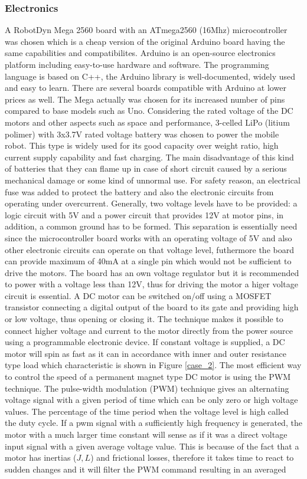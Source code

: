 \documentclass[12pt,english]{article}
\begin{document}
\subsubsection{Electronics}
A RobotDyn Mega 2560 board with an ATmega2560 (16Mhz) microcontroller was chosen which is a cheap version of the original Arduino board having the same capabilities and compatibilites. Arduino is an open-source electronics platform including easy-to-use hardware and software.\cite{arduino} The programming language is based on C++, the Arduino library is well-documented, widely used and easy to learn. There are several boards compatible with Arduino at lower prices as well. The Mega actually was chosen for its increased number of pins compared to base models such as Uno.
Considering the rated voltage of the DC motors and other aspects such as space and performance, 3-celled LiPo (litium polimer) with 3x3.7V rated voltage battery was chosen to power the mobile robot. This type is widely used for its good capacity over weight ratio, high current supply capability and fast charging. The main disadvantage of this kind of batteries that they can flame up in case of short circuit caused by a serious mechanical damage or some kind of unnormal use. For safety reason, an electrical fuse was added to protect the battery and also the electronic circuits from operating under overcurrent. Generally, two voltage levels have to be provided: a logic circuit with 5V and a power circuit that provides 12V at motor pins, in addition, a common ground has to be formed. This separation is essentially need since the microcontroller board works with an operating voltage of 5V and also other electronic circuits can operate on that voltage level, futhermore the board can provide maximum of 40mA at a single pin which would not be sufficient to drive the motors. The board has an own voltage regulator but it is recommended to power with a voltage less than 12V, thus for driving the motor a higer voltage circuit is essential. \cite{arduino} A DC motor can be switched on/off using a MOSFET transistor connecting a digital output of the board to its gate and providing high or low voltage, thus opening or closing it. The technique makes it possible to connect higher voltage and current to the motor directly from the power source using a programmable electronic device. If constant voltage is supplied, a DC motor will spin as fast as it can in accordance with inner and outer resistance type load which characteristic is shown in Figure \ref{case_2}. The most efficient way to control the speed of a permanent magnet type DC motor is using the PWM technique. The pulse-width modulation (PWM) technique gives an alternating voltage signal with a given period of time which can be only zero or high voltage values. The percentage of the time period when the voltage level is high called the duty cycle. If a pwm signal with a sufficiently high frequency is generated, the motor with a much larger time constant will sense as if it was a direct voltage input signal with a given average voltage value. This is because of the fact that a motor has inertias ($J,L$) and frictional losses, therefore it takes time to react to sudden changes and it will filter the PWM command resulting in an averaged 
\end{document}
